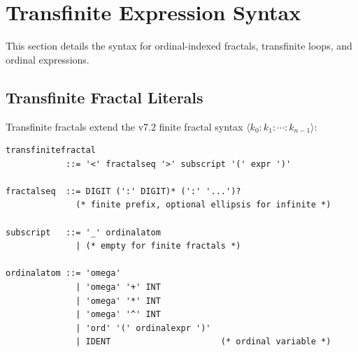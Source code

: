 \section{Transfinite Expression Syntax}
\label{sec:transfinite-syntax}

This section details the syntax for ordinal-indexed fractals, transfinite loops, and ordinal expressions.

\subsection{Transfinite Fractal Literals}
\label{subsec:transfinite-fractal-literals}

\begin{definition}
\label{def:transfinite-fractal-syntax}
Transfinite fractals extend the v7.2 finite fractal syntax $\langle k_0 : k_1 : \cdots : k_{n-1} \rangle$:
\begin{lstlisting}[style=bnf,caption={Transfinite Fractal Grammar}]
transfinitefractal
            ::= '<' fractalseq '>' subscript '(' expr ')'

fractalseq  ::= DIGIT (':' DIGIT)* (':' '...')?
              (* finite prefix, optional ellipsis for infinite *)

subscript   ::= '_' ordinalatom
              | (* empty for finite fractals *)

ordinalatom ::= 'omega'
              | 'omega' '+' INT
              | 'omega' '*' INT
              | 'omega' '^' INT
              | 'ord' '(' ordinalexpr ')'
              | IDENT                      (* ordinal variable *)
\end{lstlisting}
\end{definition}

